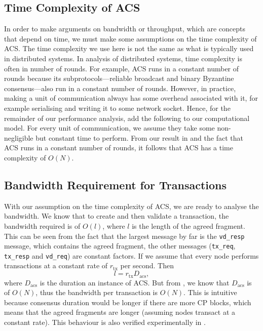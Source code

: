 \subsection{Time Complexity of ACS}
\label{sec:acs-time-complexity}
In order to make arguments on bandwidth or throughput, which are concepts that depend on time,
we must make some assumptions on the time complexity of ACS.
The time complexity we use here is not the same as what is typically used in distributed systems.
In analysis of distributed systems, time complexity is often in number of rounds.
For example, ACS runs in a constant number of rounds because its subprotocols---reliable broadcast and binary Byzantine consensus---also run in a constant number of rounds.
However, in practice, making a unit of communication always has some overhead associated with it, for example serialising and writing it to some network socket.
Hence, for the remainder of our performance analysis, add the following to our computational model.
For every unit of communication, we assume they take some non-negligible but constant time to perform.
From our result in  and the fact that ACS runs in a constant number of rounds,
it follows that ACS has a time complexity of $O(N)$.

\subsection{Bandwidth Requirement for Transactions}
With our assumption on the time complexity of ACS,
we are ready to analyse the bandwidth.
We know that to create and then validate a transaction, the bandwidth required is of $O(l)$,
where $l$ is the length of the agreed fragment.
This can be seen from the fact that the largest message by far is the \texttt{vd\_resp} message,
which contains the agreed fragment,
the other messages (\texttt{tx\_req}, \texttt{tx\_resp} and \texttt{vd\_req}) are constant factors.
If we assume that every node performs transactions at a constant rate of $r_{\text{tx}}$ per second.
Then
$$l = r_{\text{tx}} D_{\text{acs}},$$
where $D_{\text{acs}}$ is the duration an instance of ACS.
But from ,
we know that $D_{\text{acs}}$ is of $O(N)$, thus the bandwidth per transaction is $O(N)$.
This is intuitive because consensus duration would be longer if there are more CP blocks, which means that the agreed fragments are longer (assuming nodes transact at a constant rate).
This behaviour is also verified experimentally in .

